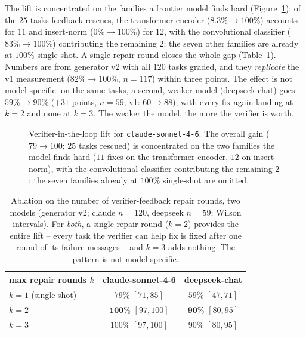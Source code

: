\documentclass[11pt]{article}
\begin{document}
The lift is concentrated on the families a frontier model finds hard (Figure~\ref{fig:lift}): of the $25$ tasks feedback rescues, the transformer encoder ($8.3\%\to100\%$) accounts for $11$ and insert-norm ($0\%\to100\%$) for $12$, with the convolutional classifier ($83\%\to100\%$) contributing the remaining $2$; the seven other families are already at $100\%$ single-shot. A single repair round closes the whole gap (Table~\ref{tab:ablation}). Numbers are from generator v2 with all $120$ tasks graded, and they \emph{replicate} the v1 measurement ($82\%\to100\%$, $n{=}117$) within three points. The effect is not model-specific: on the same tasks, a second, weaker model (deepseek-chat) goes $59\%\to90\%$ ($+31$ points, $n{=}59$; v1: $60\to88$), with every fix again landing at $k{=}2$ and none at $k{=}3$. The weaker the model, the more the verifier is worth.

\begin{figure}[t]
\centering
{}
\caption{Verifier-in-the-loop lift for \texttt{claude-sonnet-4-6}. The overall gain ($79\to100$; $25$ tasks rescued) is concentrated on the two families the model finds hard ($11$ fixes on the transformer encoder, $12$ on insert-norm), with the convolutional classifier contributing the remaining $2$; the seven families already at $100\%$ single-shot are omitted.}
\label{fig:lift}
\end{figure}

\begin{table}[t]
\centering\small
\begin{tabular}{lcc}
\toprule
max repair rounds $k$ & claude-sonnet-4-6 & deepseek-chat \\
\midrule
$k=1$ (single-shot) & $79\%$ $[71,85]$ & $59\%$ $[47,71]$ \\
$k=2$ & $\mathbf{100\%}$ $[97,100]$ & $\mathbf{90\%}$ $[80,95]$ \\
$k=3$ & $100\%$ $[97,100]$ & $90\%$ $[80,95]$ \\
\bottomrule
\end{tabular}
\caption{Ablation on the number of verifier-feedback repair rounds, two models (generator v2; claude $n{=}120$, deepseek $n{=}59$; Wilson intervals). For \emph{both}, a single repair round ($k{=}2$) provides the entire lift -- every task the verifier can help fix is fixed after one round of its failure messages -- and $k{=}3$ adds nothing. The pattern is not model-specific.}
\label{tab:ablation}
\end{table}
\end{document}
